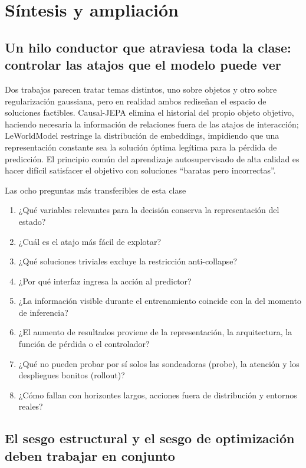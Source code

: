 \documentclass[a4paper]{article}
\begin{document}
\section{Síntesis y ampliación}

\subsection{Un hilo conductor que atraviesa toda la clase: controlar las atajos que el modelo puede ver}

Dos trabajos parecen tratar temas distintos, uno sobre objetos y otro sobre regularización gaussiana, pero en realidad ambos rediseñan el espacio de soluciones factibles. Causal-JEPA elimina el historial del propio objeto objetivo, haciendo necesaria la información de relaciones fuera de las atajos de interacción; LeWorldModel restringe la distribución de embeddings, impidiendo que una representación constante sea la solución óptima legítima para la pérdida de predicción. El principio común del aprendizaje autosupervisado de alta calidad es hacer difícil satisfacer el objetivo con soluciones ``baratas pero incorrectas''.

\begin{importantbox}{Las ocho preguntas más transferibles de esta clase}
\begin{enumerate}
  \item ¿Qué variables relevantes para la decisión conserva la representación del estado?
  \item ¿Cuál es el atajo más fácil de explotar?
  \item ¿Qué soluciones triviales excluye la restricción anti-collapse?
  \item ¿Por qué interfaz ingresa la acción al predictor?
  \item ¿La información visible durante el entrenamiento coincide con la del momento de inferencia?
  \item ¿El aumento de resultados proviene de la representación, la arquitectura, la función de pérdida o el controlador?
  \item ¿Qué no pueden probar por sí solos las sondeadoras (probe), la atención y los despliegues bonitos (rollout)?
  \item ¿Cómo fallan con horizontes largos, acciones fuera de distribución y entornos reales?
\end{enumerate}
\end{importantbox}

\subsection{El sesgo estructural y el sesgo de optimización deben trabajar en conjunto}
\end{document}
